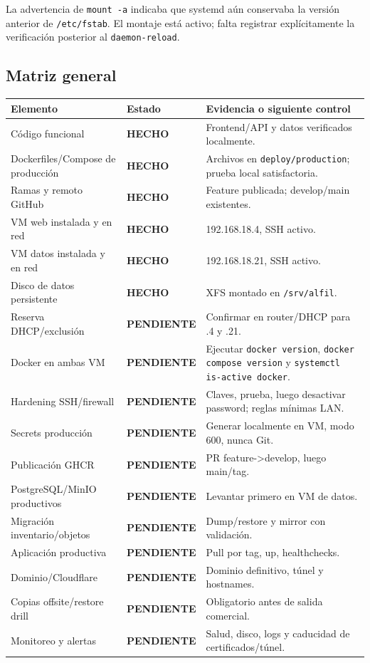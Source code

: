 \documentclass[11pt,a4paper]{article}
\newcommand{\ok}{\textcolor{done}{\textbf{HECHO}}}
\newcommand{\pending}{\textcolor{warning}{\textbf{PENDIENTE}}}
\newcommand{\code}[1]{\nolinkurl{#1}}
\begin{document}
La advertencia de \code{mount -a} indicaba que systemd aún conservaba la versión anterior de \code{/etc/fstab}. El montaje está activo; falta registrar explícitamente la verificación posterior al \code{daemon-reload}.

\subsection{Matriz general}

\begin{longtable}{L{6.2cm}L{2.2cm}L{7.1cm}}
\toprule
\textbf{Elemento} & \textbf{Estado} & \textbf{Evidencia o siguiente control}\\
\midrule
\endhead
Código funcional & \ok & Frontend/API y datos verificados localmente.\\
Dockerfiles/Compose de producción & \ok & Archivos en \code{deploy/production}; prueba local satisfactoria.\\
Ramas y remoto GitHub & \ok & Feature publicada; develop/main existentes.\\
VM web instalada y en red & \ok & 192.168.18.4, SSH activo.\\
VM datos instalada y en red & \ok & 192.168.18.21, SSH activo.\\
Disco de datos persistente & \ok & XFS montado en \code{/srv/alfil}.\\
Reserva DHCP/exclusión & \pending & Confirmar en router/DHCP para .4 y .21.\\
Docker en ambas VM & \pending & Ejecutar \code{docker version}, \code{docker compose version} y \code{systemctl is-active docker}.\\
Hardening SSH/firewall & \pending & Claves, prueba, luego desactivar password; reglas mínimas LAN.\\
Secrets producción & \pending & Generar localmente en VM, modo 600, nunca Git.\\
Publicación GHCR & \pending & PR feature->develop, luego main/tag.\\
PostgreSQL/MinIO productivos & \pending & Levantar primero en VM de datos.\\
Migración inventario/objetos & \pending & Dump/restore y mirror con validación.\\
Aplicación productiva & \pending & Pull por tag, up, healthchecks.\\
Dominio/Cloudflare & \pending & Dominio definitivo, túnel y hostnames.\\
Copias offsite/restore drill & \pending & Obligatorio antes de salida comercial.\\
Monitoreo y alertas & \pending & Salud, disco, logs y caducidad de certificados/túnel.\\
\bottomrule
\end{longtable}
\end{document}
